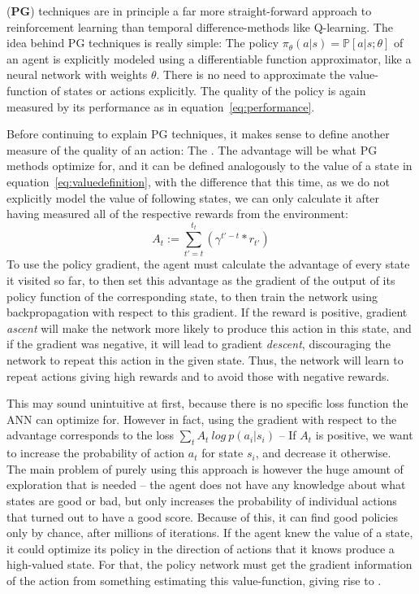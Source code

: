  (\textbf{PG}) techniques are in principle a far more straight-forward approach to reinforcement learning than temporal difference-methods like Q-learning. The idea behind PG techniques is really simple: The policy $\pi_\theta(a|s) = \mathds{P}[a|s;\theta]$ of an agent is explicitly modeled using a differentiable function approximator, like a neural network with weights $\theta$. There is no need  to approximate the value-function of states or actions explicitly. The quality of the policy is again measured by its performance as in equation~\ref{eq:performance}. 

Before continuing to explain PG techniques, it makes sense to define another measure of the quality of an action: The . The advantage will be what PG methods optimize for, and it can be defined analogously to the value of a state in equation~\ref{eq:valuedefinition}, with the difference that this time, as we do not explicitly model the value of following states, we can only calculate it after having measured all of the respective rewards from the environment:
\begin{equation}
	 A_t := \sum_{t'=t}^{t_t} ( \gamma^{t'-t} * r_{t'} ) 
\end{equation}
To use the policy gradient, the agent must calculate the advantage of every state it visited so far, to then set this advantage as the gradient of the output of its policy function of the corresponding state, to then train the network using backpropagation with respect to this gradient. If the reward is positive, gradient \textit{ascent} will make the network more likely to produce this action in this state, and if the gradient was negative, it will lead to gradient \textit{descent}, discouraging the network to repeat this action in the given state. Thus, the network will learn to repeat actions giving high rewards and to avoid those with negative rewards.

This may sound unintuitive at first, because there is no specific loss function the ANN can optimize for. However in fact, using the gradient with respect to the advantage corresponds to the loss $\sum_t A_t~log~p(a_i|s_i)$ -- If $A_t$ is positive, we want to increase the probability of action $a_t$ for state $s_i$, and decrease it otherwise.\\

\noindent The main problem of purely using this approach is however the huge amount of exploration that is needed -- the agent does not have any knowledge about what states are good or bad, but only increases the probability of individual actions that turned out to have a good score. Because of this, it can find good policies only by chance, after millions of iterations. If the agent knew the value of a state, it could optimize its policy in the direction of actions that it knows produce a high-valued state. For that, the policy network must get the gradient information of the action from something estimating this value-function, giving rise to .

